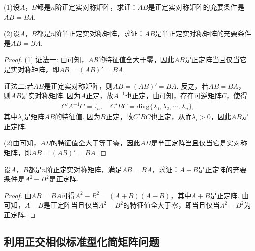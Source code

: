 \documentclass[../../main.tex]{subfiles}%
\begin{document}
\begin{proposition}\label{proposition:例9.67}
(1)设\(A\)，\(B\)都是\(n\)阶正定实对称矩阵，求证：\(AB\)是正定实对称矩阵的充要条件是\(AB = BA\).

(2)设\(A\)，\(B\)都是\(n\)阶半正定实对称矩阵，求证：\(AB\)是半正定实对称矩阵的充要条件是\(AB = BA\).
\end{proposition}
\begin{proof}

(1)
{\color{blue}证法一:}
由可知，\(AB\)的特征值全大于零，因此\(AB\)是正定阵当且仅当它是实对称矩阵，即\(AB = (AB)' = BA\).

{\color{blue}证法二:}若\(AB\)是正定实对称矩阵，则\(AB=(AB)' = BA\). 反之，若\(AB = BA\)，则\(AB\)是实对称矩阵. 因为\(A\)正定，故\(A^{-1}\)也正定，由可知，存在可逆矩阵\(C\)，使得
\begin{align*}
C'A^{-1}C = I_n,\quad C'BC = \mathrm{diag}\{\lambda_1,\lambda_2,\cdots,\lambda_n\},
\end{align*}
其中\(\lambda_i\)是矩阵\(AB\)的特征值. 因为\(B\)正定，故\(C'BC\)也正定，从而\(\lambda_i>0\)，因此\(AB\)是正定阵. 

(2)由可知，\(AB\)的特征值全大于等于零，因此\(AB\)是半正定阵当且仅当它是实对称矩阵，即\(AB=(AB)' = BA\). 

\end{proof}

\begin{proposition}\label{proposition:例9.68}
设\(A\)，\(B\)都是\(n\)阶正定实对称矩阵，满足\(AB = BA\)，求证：\(A - B\)是正定阵的充要条件是\(A^2 - B^2\)是正定阵.
\end{proposition}
\begin{proof}

由\(AB = BA\)可得\(A^2 - B^2 = (A + B)(A - B)\)，其中\(A + B\)是正定阵. 由可知，\(A - B\)是正定阵当且仅当\(A^2 - B^2\)的特征值全大于零，即当且仅当\(A^2 - B^2\)为正定阵.

\end{proof}


\subsection{利用正交相似标准型化简矩阵问题}
\end{document}
